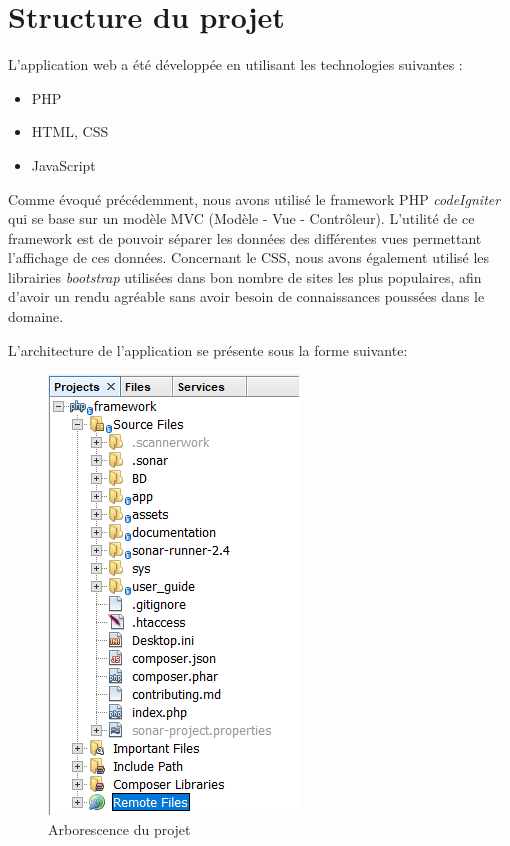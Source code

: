 \documentclass{polytech/polytech}
\begin{document}
\chapter{Structure du projet}

L'application web a été développée en utilisant les technologies suivantes :

\begin{itemize}
	\item PHP
	\item HTML, CSS
	\item JavaScript
\end{itemize}

Comme évoqué précédemment, nous avons utilisé le framework PHP \textit{codeIgniter} qui se base sur un modèle MVC (Modèle - Vue - Contrôleur). L'utilité de ce framework est de pouvoir séparer les données des différentes vues permettant l'affichage de ces données. Concernant le CSS, nous avons également utilisé les librairies \textit{bootstrap} utilisées dans bon nombre de sites les plus populaires, afin d'avoir un rendu agréable sans avoir besoin de connaissances poussées dans le domaine.

L'architecture de l'application se présente sous la forme suivante: 

\begin{figure}
	\includegraphics[scale=0.9]{images/arboProjet}
	\caption{Arborescence du projet}
	\label{fig:arboProjet}
\end{figure}
\end{document}
